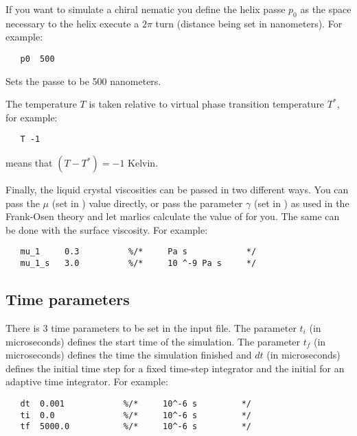 \documentclass{article}
\begin{document}
{If you want to simulate a chiral nematic you define the helix passe $p_0$} as the space necessary to the helix execute a $2 \pi$  turn (distance being set in nanometers). For example:

\begin{lstlisting}
   p0  500
\end{lstlisting}
Sets the passe to be 500 nanometers.


The temperature $T$  is taken relative to virtual phase transition temperature $T^*$, for example:

\begin{lstlisting}
   T -1
\end{lstlisting}
means that $(T-T^*)=-1$ Kelvin.

Finally, the liquid crystal viscosities can be passed in two different ways. You can pass the $\mu$ (set in ) value directly, or pass the parameter $\gamma$ (set in ) as used in the Frank-Osen theory and let marlics calculate the value of  for you. The same can be done with the surface viscosity. For example:
\begin{lstlisting}
   mu_1     0.3          %/*     Pa s            */
   mu_1_s   3.0          %/*     10 ^-9 Pa s     */
\end{lstlisting}


\subsection{Time parameters}

There is 3 time parameters to be set in the input file.  {The parameter $t_i$ (in microseconds) defines the start time of the simulation. The parameter $t_f$ (in microseconds) defines the time the simulation finished and $dt$ (in microseconds) defines the initial time step for a fixed time-step integrator and the initial for an adaptive time integrator}. For example:
\begin{lstlisting}
   dt  0.001            %/*     10^-6 s         */	
   ti  0.0              %/*     10^-6 s         */	
   tf  5000.0           %/*     10^-6 s         */
\end{lstlisting}
\end{document}
